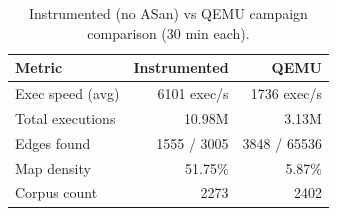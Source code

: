 \documentclass[letterpaper,twocolumn,10pt]{article}
\begin{document}
\begin{table}[h]
\centering
\small
\begin{tabular}{lrr}
\toprule
Metric & Instrumented & QEMU \\
\midrule
Exec speed (avg) & 6101 exec/s & 1736 exec/s \\
Total executions & 10.98M & 3.13M \\
Edges found & 1555 / 3005 & 3848 / 65536 \\
Map density & 51.75\% & 5.87\% \\
Corpus count & 2273 & 2402 \\
\bottomrule
\end{tabular}
\caption{Instrumented (no ASan) vs QEMU campaign comparison (30 min each).}
\label{tab:qemu-compare}
\end{table}



\end{document}
